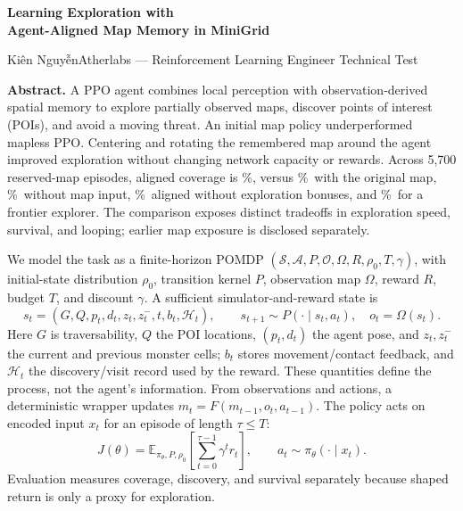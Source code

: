 \documentclass[10pt,a4paper]{article}
\newcommand{\reportauthor}{{\fontencoding{T5}\selectfont Kiên Nguyễn}}
\newcommand{\pct}{\%}
\newcommand{\heading}[1]{\vspace{5pt}{\large\bfseries\color{ink}#1}\par\vspace{1pt}}
\begin{document}
{\LARGE\bfseries\color{ink}Learning Exploration with\\[3pt]Agent-Aligned Map Memory in MiniGrid\par}
\vspace{5pt}
{\small\reportauthor\hfill Atherlabs --- Reinforcement Learning Engineer Technical Test\par}
\vspace{6pt}
\textbf{Abstract.} A PPO agent combines local perception with observation-derived spatial memory to explore partially observed maps, discover points of interest (POIs), and avoid a moving threat. An initial map policy underperformed mapless PPO. Centering and rotating the remembered map around the agent improved exploration without changing network capacity or rewards. Across 5,700 reserved-map episodes, aligned coverage is \AlignedCoverage\pct, versus \OriginalCoverage\pct\ with the original map, \MaplessCoverage\pct\ without map input, \NoBonusCoverage\pct\ aligned without exploration bonuses, and \FrontierCoverage\pct\ for a frontier explorer. The comparison exposes distinct tradeoffs in exploration speed, survival, and looping; earlier map exposure is disclosed separately.

\heading{1\quad Problem formulation and environment}
We model the task as a finite-horizon POMDP $(\mathcal S,\mathcal A,P,\mathcal O,\Omega,R,\rho_0,T,\gamma)$, with initial-state distribution $\rho_0$, transition kernel $P$, observation map $\Omega$, reward $R$, budget $T$, and discount $\gamma$. A sufficient simulator-and-reward state is
\[
 s_t=(G,Q,p_t,d_t,z_t,z_t^{-},t,b_t,\mathcal H_t),\qquad
 s_{t+1}\sim P(\cdot\mid s_t,a_t),\quad o_t=\Omega(s_t).
\]
Here $G$ is traversability, $Q$ the POI locations, $(p_t,d_t)$ the agent pose, and $z_t,z_t^{-}$ the current and previous monster cells; $b_t$ stores movement/contact feedback, and $\mathcal H_t$ the discovery/visit record used by the reward. These quantities define the process, not the agent's information. From observations and actions, a deterministic wrapper updates $m_t=F(m_{t-1},o_t,a_{t-1})$. The policy acts on encoded input $x_t$ for an episode of length $\tau\leq T$:
\[
 J(\theta)=\mathbb E_{\pi_\theta,P,\rho_0}\!\left[\sum_{t=0}^{\tau-1}\gamma^t r_t\right],
 \qquad a_t\sim\pi_\theta(\cdot\mid x_t).
\]
Evaluation measures coverage, discovery, and survival separately because shaped return is only a proxy for exploration.
\end{document}
